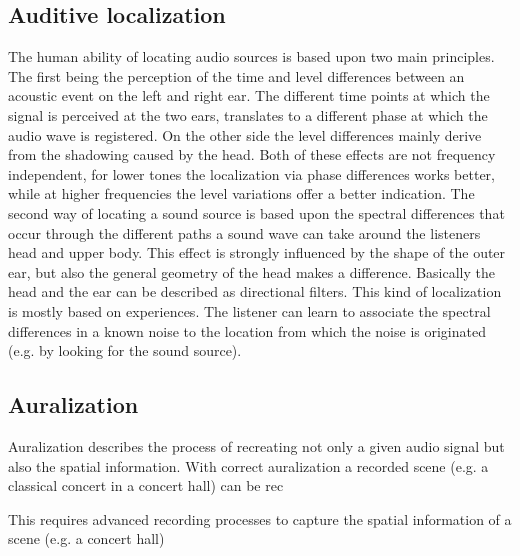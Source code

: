 \documentclass[a4paper,11pt]{article}%
\renewcommand{\\}{\vspace*{0.5\baselineskip} \newline}
\begin{document}
\subsection{Auditive localization}
The human ability of locating audio sources is based upon two main principles. The first being the perception of the time and level differences between an acoustic event on the left and right ear. The different time points at which the signal is perceived at the two ears, translates to a different phase at which the audio wave is registered. On the other side the level differences mainly derive from the shadowing caused by the head. Both of these effects are not frequency independent, for lower tones the localization via phase differences works better, while at higher frequencies the level variations offer a better indication.
\newline
\newline
The second way of locating a sound source is based upon the spectral differences that occur through the different paths a sound wave can take around the listeners head and upper body. This effect is strongly influenced by the shape of the outer ear, but also the general geometry of the head makes a difference. Basically the head and the ear can be described as directional filters. This kind of localization is mostly based on experiences. The listener can learn to associate the spectral differences in a known noise to the location from which the noise is originated (e.g. by looking for the sound source).



\subsection{Auralization}
\label{Sec:auralization}
Auralization describes the process of recreating not only a given audio signal but also the spatial information. With correct auralization a recorded scene (e.g. a classical concert in a concert hall) can be rec

This requires advanced recording processes to capture the spatial information of a scene (e.g. a concert hall)
\end{document}
